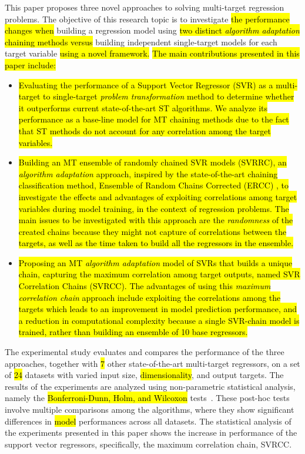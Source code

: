\documentclass[preprint,12pt]{elsarticle}
\begin{document}
This paper proposes three novel approaches to solving multi-target regression problems. The objective of this research topic is to investigate \hl{the performance changes when} building a regression model using \hl{two distinct \textit{algorithm adaptation} chaining methods versus} building independent single-target models for each target variable \hl{using a novel framework.} \hl{The main contributions presented in this paper include:}

\begin{itemize}
\item \hl{Evaluating the performance of a Support Vector Regressor (SVR) as a multi-target to single-target \textit{problem transformation} method to determine whether it outperforms current state-of-the-art ST algorithms. We analyze its performance as a base-line model for MT chaining methods due to the fact that ST methods do not account for any correlation among the target variables.}
\newpage

\item \hl{Building an MT ensemble of randomly chained SVR models (SVRRC), an \textit{algorithm adaptation} approach, inspired by the state-of-the-art chaining classification method, Ensemble of Random Chains Corrected (ERCC) {\cite{Xiong2014}}, to investigate the effects and advantages of exploiting correlations among target variables during model training, in the context of regression problems. The main issues to be investigated with this approach are the \textit{randomness} of the created chains because they might not capture of correlations between the targets, as well as the time taken to build all the regressors in the ensemble.}

\item \hl{Proposing an MT \textit{algorithm adaptation} model of SVRs that builds a unique chain, capturing the maximum correlation among target outputs, named SVR Correlation Chains (SVRCC). The advantages of using this \textit{maximum correlation chain} approach include exploiting the correlations among the targets which leads to an improvement in model prediction performance, and a reduction in computational complexity because a single SVR-chain model is trained, rather than building an ensemble of 10 base regressors.}
\end{itemize}

The experimental study evaluates and compares the performance of the three approaches, together with  \hl{7} other state-of-the-art multi-target regressors, on a set of \hl{24} datasets with varied input size, \hl{dimensionality}, and output targets. The results of the experiments are analyzed using non-parametric statistical analysis, namely the \hl{Bonferroni-Dunn, Holm, and  Wilcoxon} tests~\cite{Garcia20102044}. These post-hoc tests involve multiple comparisons among the algorithms, where they show significant differences in \hl{model} performances across all datasets. The statistical analysis of the experiments presented in this paper shows the increase in performance of the support vector regressors, specifically, the maximum correlation chain, SVRCC.
\end{document}

